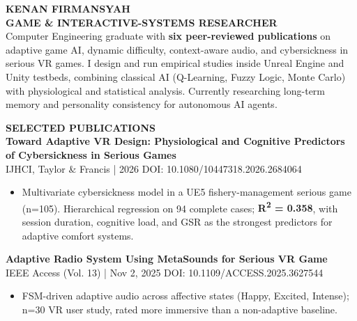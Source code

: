 \documentclass[11pt,a4paper]{article}
\newcommand{\mainsection}[1]{%
    {\large\bfseries\MakeUppercase{#1}}\\[8pt]%
}
\begin{document}
\begin{minipage}[t]{14cm}
\vspace{0.5cm}
\hspace{0.8cm}
\begin{minipage}[t]{12.5cm}

{\Huge\bfseries\MakeUppercase{Kenan Firmansyah}}\\[6pt]
{\large\bfseries GAME \& INTERACTIVE-SYSTEMS RESEARCHER}\\[12pt]

{\small Computer Engineering graduate with \textbf{six peer-reviewed publications} on adaptive game AI, dynamic difficulty, context-aware audio, and cybersickness in serious VR games. I design and run empirical studies inside Unreal Engine and Unity testbeds, combining classical AI (Q-Learning, Fuzzy Logic, Monte Carlo) with physiological and statistical analysis. Currently researching long-term memory and personality consistency for autonomous AI agents.}

\vspace{0.5cm}

\mainsection{Selected Publications}

\textbf{Toward Adaptive VR Design: Physiological and Cognitive Predictors of Cybersickness in Serious Games}\\
{\small IJHCI, Taylor \& Francis | 2026 \textbar{} DOI: 10.1080/10447318.2026.2684064}
\begin{itemize}[leftmargin=*, nosep, itemsep=2pt, topsep=2pt]
    \item Multivariate cybersickness model in a UE5 fishery-management serious game (n=105). Hierarchical regression on 94 complete cases; \textbf{R\textsuperscript{2} = 0.358}, with session duration, cognitive load, and GSR as the strongest predictors for adaptive comfort systems.
\end{itemize}

\vspace{0.3cm}

\textbf{Adaptive Radio System Using MetaSounds for Serious VR Game}\\
{\small IEEE Access (Vol. 13) | Nov 2, 2025 \textbar{} DOI: 10.1109/ACCESS.2025.3627544}
\begin{itemize}[leftmargin=*, nosep, itemsep=2pt, topsep=2pt]
    \item FSM-driven adaptive audio across affective states (Happy, Excited, Intense); n=30 VR user study, rated more immersive than a non-adaptive baseline.
\end{itemize}


\end{minipage}
\end{minipage}
\end{document}

